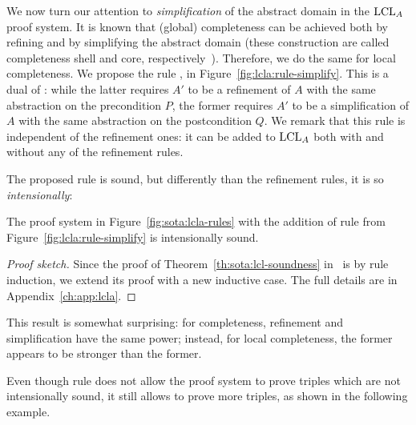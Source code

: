 We now turn our attention to \emph{simplification} of the abstract domain in the $\text{LCL}_A$ proof system. It is known that (global) completeness can be achieved both by refining and by simplifying the abstract domain (these construction are called completeness shell and core, respectively~\cite{GRS00}). Therefore, we do the same for local completeness.
We propose the rule , in Figure~\ref{fig:lcla:rule-simplify}. This is a dual of : while the latter requires $A'$ to be a refinement of $A$ with the same abstraction on the precondition $P$, the former requires $A'$ to be a simplification of $A$ with the same abstraction on the postcondition $Q$. We remark that this rule is independent of the refinement ones: it can be added to $\text{LCL}_A$ both with and without any of the refinement rules.

The proposed rule  is sound, but differently than the refinement rules, it is so \emph{intensionally}:

\begin{theorem}\label{th:lcla:soundness-rule-simpl}
	The proof system in Figure~\ref{fig:sota:lcla-rules} with the addition of rule  from Figure~\ref{fig:lcla:rule-simplify} is intensionally sound.
\end{theorem}
\begin{proof}[Proof sketch]
	Since the proof of Theorem~\ref{th:sota:lcl-soundness} in~\cite{BGGR21} is by rule induction, we extend its proof with a new inductive case. The full details are in Appendix~\ref{ch:app:lcla}.
\end{proof}

This result is somewhat surprising: for completeness, refinement and simplification have the same power; instead, for local completeness, the former appears to be stronger than the former.

Even though rule  does not allow the proof system to prove triples which are not intensionally sound, it still allows to prove more triples, as shown in the following example.

